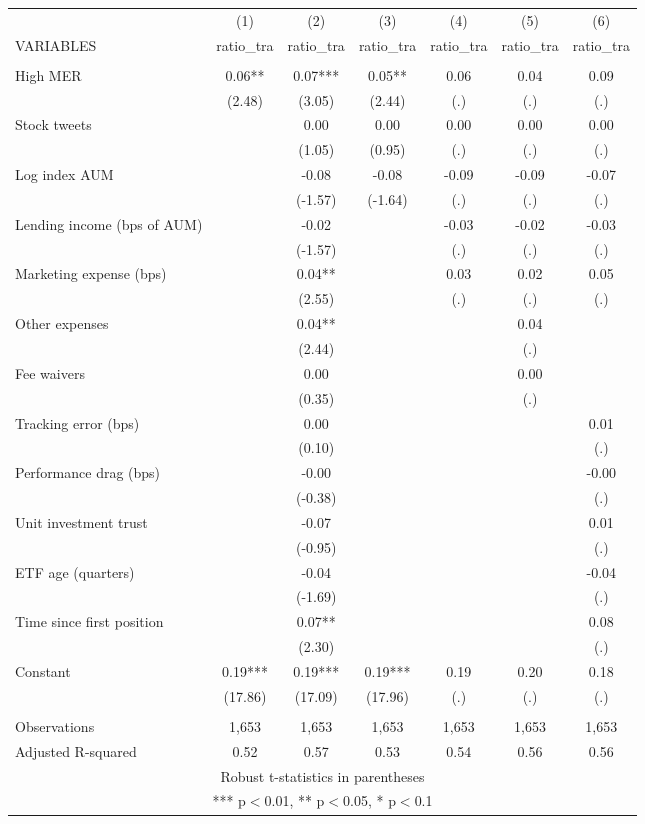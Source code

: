 \documentclass[]{article}
\begin{document}
\begin{tabular}{lcccccc} \hline
 & (1) & (2) & (3) & (4) & (5) & (6) \\
VARIABLES & ratio\_tra & ratio\_tra & ratio\_tra & ratio\_tra & ratio\_tra & ratio\_tra \\ \hline
 &  &  &  &  &  &  \\
High MER & 0.06** & 0.07*** & 0.05** & 0.06 & 0.04 & 0.09 \\
 & (2.48) & (3.05) & (2.44) & (.) & (.) & (.) \\
Stock tweets &  & 0.00 & 0.00 & 0.00 & 0.00 & 0.00 \\
 &  & (1.05) & (0.95) & (.) & (.) & (.) \\
Log index AUM &  & -0.08 & -0.08 & -0.09 & -0.09 & -0.07 \\
 &  & (-1.57) & (-1.64) & (.) & (.) & (.) \\
Lending income (bps of AUM) &  & -0.02 &  & -0.03 & -0.02 & -0.03 \\
 &  & (-1.57) &  & (.) & (.) & (.) \\
Marketing expense (bps) &  & 0.04** &  & 0.03 & 0.02 & 0.05 \\
 &  & (2.55) &  & (.) & (.) & (.) \\
Other expenses &  & 0.04** &  &  & 0.04 &  \\
 &  & (2.44) &  &  & (.) &  \\
Fee waivers &  & 0.00 &  &  & 0.00 &  \\
 &  & (0.35) &  &  & (.) &  \\
Tracking error (bps) &  & 0.00 &  &  &  & 0.01 \\
 &  & (0.10) &  &  &  & (.) \\
Performance drag (bps) &  & -0.00 &  &  &  & -0.00 \\
 &  & (-0.38) &  &  &  & (.) \\
Unit investment trust &  & -0.07 &  &  &  & 0.01 \\
 &  & (-0.95) &  &  &  & (.) \\
ETF age (quarters) &  & -0.04 &  &  &  & -0.04 \\
 &  & (-1.69) &  &  &  & (.) \\
Time since first position &  & 0.07** &  &  &  & 0.08 \\
 &  & (2.30) &  &  &  & (.) \\
Constant & 0.19*** & 0.19*** & 0.19*** & 0.19 & 0.20 & 0.18 \\
 & (17.86) & (17.09) & (17.96) & (.) & (.) & (.) \\
 &  &  &  &  &  &  \\
Observations & 1,653 & 1,653 & 1,653 & 1,653 & 1,653 & 1,653 \\
 Adjusted R-squared & 0.52 & 0.57 & 0.53 & 0.54 & 0.56 & 0.56 \\ \hline
\multicolumn{7}{c}{ Robust t-statistics in parentheses} \\
\multicolumn{7}{c}{ *** p$<$0.01, ** p$<$0.05, * p$<$0.1} \\
\end{tabular}
\end{document}
